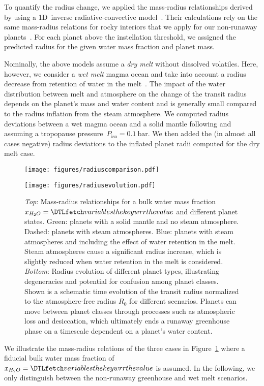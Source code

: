 \documentclass[twocolumn,twocolappendix,linenumbers]{aastex631}
\begin{document}
To quantify the radius change, we applied the mass-radius relationships derived by \citet{Turbet2020} using a 1D~inverse radiative-convective model~\citep{Turbet2019}.
Their calculations rely on the same mass-radius relations for rocky interiors that we apply for our non-runaway planets~\citep{Zeng2016}.
For each planet above the instellation threshold, we assigned the predicted radius for the given water mass fraction and planet mass.

Nominally, the above models assume a \textit{dry melt} without dissolved volatiles.
Here, however, we consider a \textit{wet melt} magma ocean and take into account a radius decrease from retention of water in the melt~\citep{Dorn2021}.
The impact of the water distribution between melt and atmosphere on the change of the transit radius depends on the planet's mass and water content and is generally small compared to the radius inflation from the steam atmosphere.
We computed radius deviations between a wet magma ocean and a solid mantle following \citet{Dorn2021} and assuming a tropopause pressure~$P_\mathrm{iso}=\SI{0.1}{\bar}$.
We then added the (in almost all cases negative) radius deviations to the inflated planet radii computed for the dry melt case.

\begin{figure}
    \begin{centering}
        \texttt{[image: figures/radiuscomparison.pdf]}
    \end{centering}
    \begin{centering}
        \texttt{[image: figures/radiusevolution.pdf]}
        \caption{
            \textit{Top}: Mass-radius relationships for a bulk water mass fraction $x_{H_2O}= \var{wrr}$ and different planet states. Green: planets with a solid mantle and no steam atmosphere. Dashed: planets with steam atmospheres. Blue: planets with steam atmospheres and including the effect of water retention in the melt.
                Steam atmospheres cause a significant radius increase, which is slightly reduced when water retention in the melt is considered.
            \textit{Bottom}: Radius evolution of different planet types, illustrating degeneracies and potential for confusion among planet classes. Shown is a schematic time evolution of the transit radius normalized to the atmosphere-free radius $R_\mathrm{0}$ for different scenarios. Planets can move between planet classes through processes such as atmospheric loss and desiccation, which ultimately ends a runaway greenhouse phase on a timescale dependent on a planet's water content.}
        \label{fig:radiusevolution}
    \end{centering}
\end{figure}
We illustrate the mass-radius relations of the three cases in Figure~\ref{fig:radiusevolution} where a fiducial bulk water mass fraction of $x_{H_2O}= \var{wrr}$ is assumed. %
In the following, we only distinguish between the non-runaway greenhouse and wet melt scenarios.
\end{document}
